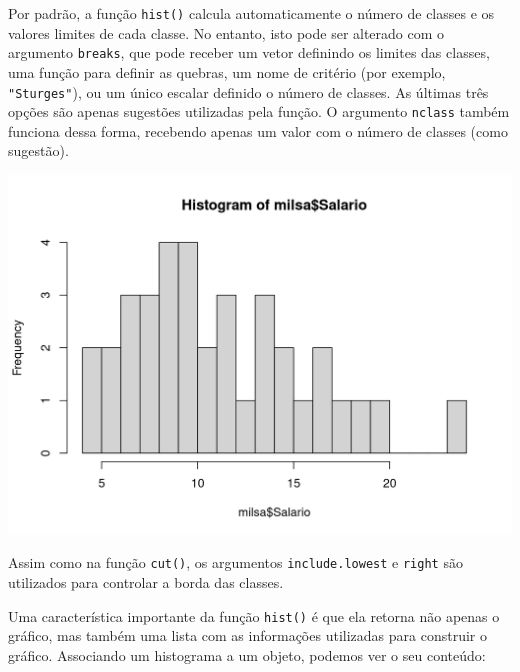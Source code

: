 \documentclass[
  10pt,
  a4paper]{book}
\newenvironment{Shaded}{\begin{snugshade}}{\end{snugshade}}
\newcommand{\AttributeTok}[1]{\textcolor[rgb]{0.77,0.63,0.00}{#1}}
\newcommand{\DecValTok}[1]{\textcolor[rgb]{0.00,0.00,0.81}{#1}}
\newcommand{\FunctionTok}[1]{\textcolor[rgb]{0.00,0.00,0.00}{#1}}
\newcommand{\NormalTok}[1]{#1}
\newcommand{\OtherTok}[1]{\textcolor[rgb]{0.56,0.35,0.01}{#1}}
\newcommand{\SpecialCharTok}[1]{\textcolor[rgb]{0.00,0.00,0.00}{#1}}
\begin{document}
Por padrão, a função \texttt{hist()} calcula automaticamente o número de
classes e os valores limites de cada classe. No entanto, isto pode ser
alterado com o argumento \texttt{breaks}, que pode receber um vetor
definindo os limites das classes, uma função para definir as quebras, um
nome de critério (por exemplo, \texttt{"Sturges"}), ou um único escalar
definido o número de classes. As últimas três opções são apenas
sugestões utilizadas pela função. O argumento \texttt{nclass} também funciona
dessa forma, recebendo apenas um valor com o número de classes (como
sugestão).

\begin{Shaded}
\end{Shaded}

\begin{center}\includegraphics{figures/unnamed-chunk-310-1} \end{center}

Assim como na função \texttt{cut()}, os argumentos \texttt{include.lowest} e \texttt{right}
são utilizados para controlar a borda das classes.

Uma característica importante da função \texttt{hist()} é que ela retorna não
apenas o gráfico, mas também uma lista com as informações utilizadas
para construir o gráfico. Associando um histograma a um objeto, podemos
ver o seu conteúdo:

\begin{Shaded}
\end{Shaded}
\end{document}
